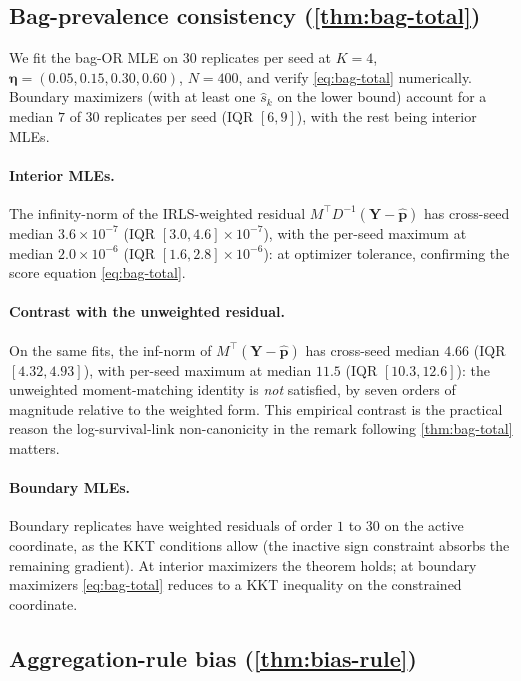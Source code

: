 \subsection{Bag-prevalence consistency (\cref{thm:bag-total})}

We fit the bag-OR MLE on $30$ replicates per seed at $K = 4$,
$\bm\eta = (0.05, 0.15, 0.30, 0.60)$, $N = 400$, and verify
\eqref{eq:bag-total} numerically. Boundary maximizers (with at
least one $\hat s_k$ on the lower bound) account for a median $7$
of $30$ replicates per seed (IQR $[6, 9]$), with the rest being
interior MLEs.

\paragraph{Interior MLEs.} The infinity-norm of the IRLS-weighted
residual $M^\top D^{-1}(\bm Y - \hat{\bm p})$ has cross-seed median
$3.6\times 10^{-7}$ (IQR $[3.0, 4.6]\times 10^{-7}$), with the
per-seed maximum at median $2.0\times 10^{-6}$ (IQR
$[1.6, 2.8]\times 10^{-6}$): at optimizer tolerance, confirming the
score equation \eqref{eq:bag-total}.

\paragraph{Contrast with the unweighted residual.} On the same
fits, the inf-norm of $M^\top(\bm Y - \hat{\bm p})$ has cross-seed
median $4.66$ (IQR $[4.32, 4.93]$), with per-seed maximum at median
$11.5$ (IQR $[10.3, 12.6]$): the unweighted moment-matching
identity is \emph{not} satisfied, by seven orders of magnitude
relative to the weighted form. This empirical contrast is the
practical reason the log-survival-link non-canonicity in the remark
following \cref{thm:bag-total} matters.

\paragraph{Boundary MLEs.} Boundary replicates have weighted
residuals of order $1$ to $30$ on the active coordinate, as the
KKT conditions allow (the inactive sign constraint absorbs the
remaining gradient). At interior maximizers the theorem holds; at
boundary maximizers \eqref{eq:bag-total} reduces to a KKT
inequality on the constrained coordinate.

\subsection{Aggregation-rule bias (\cref{thm:bias-rule})}

